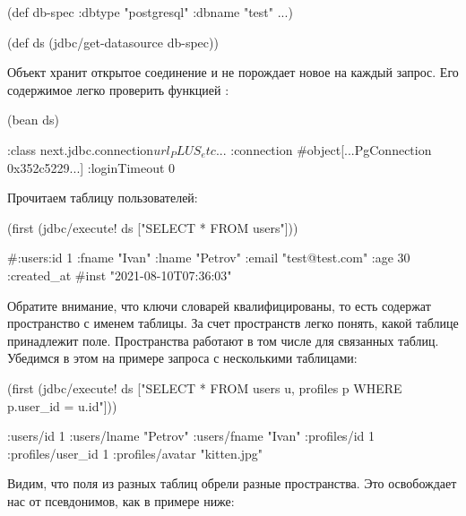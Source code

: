 \begin{english}
  \begin{clojure}
(def db-spec
  {:dbtype "postgresql" :dbname "test" ...})

(def ds
  (jdbc/get-datasource db-spec))
  \end{clojure}
\end{english}

Объект  хранит открытое соединение и не порождает новое на каждый запрос. Его содержимое легко проверить функцией :

\begin{english}
  \begin{clojure}
(bean ds)

{:class next.jdbc.connection$url_PLUS_etc$...
 :connection #object[...PgConnection 0x352c5229...]
 :loginTimeout 0}
  \end{clojure}
\end{english}

Прочитаем таблицу пользователей:

\begin{english}
  \begin{clojure}
(first (jdbc/execute! ds ["SELECT * FROM users"]))

#:users{:id 1
        :fname "Ivan"
        :lname "Petrov"
        :email "test@test.com"
        :age 30
        :created_at #inst "2021-08-10T07:36:03"}
  \end{clojure}
\end{english}

Обратите внимание, что ключи словарей квалифицированы, то есть содержат пространство с именем таблицы. За счет пространств легко понять, какой таблице принадлежит поле. Пространства работают в том числе для связанных таблиц. Убедимся в этом на примере запроса с несколькими таблицами:

\begin{english}
  \begin{clojure}
(first
  (jdbc/execute! ds
    ["SELECT *
      FROM users u, profiles p
      WHERE p.user_id = u.id"]))

{:users/id 1
 :users/lname "Petrov"
 :users/fname "Ivan"
 :profiles/id 1
 :profiles/user_id 1
 :profiles/avatar "kitten.jpg"}
  \end{clojure}
\end{english}

Видим, что поля из разных таблиц обрели разные пространства. Это освобождает нас от псевдонимов, как в примере ниже:


